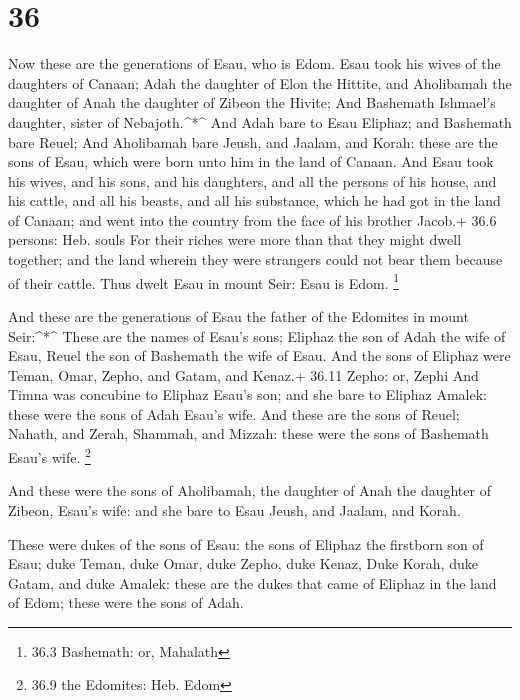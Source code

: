 \hypertarget{section-35}{%
\section{36}\label{section-35}}

 Now these are the generations of Esau, who is Edom.
 Esau took his wives of the daughters of Canaan; Adah the
daughter of Elon the Hittite, and Aholibamah the daughter of Anah the
daughter of Zibeon the Hivite;  And Bashemath Ishmael's
daughter, sister of Nebajoth.\^{}*\^{}  And Adah bare to
Esau Eliphaz; and Bashemath bare Reuel;  And Aholibamah bare
Jeush, and Jaalam, and Korah: these are the sons of Esau, which were
born unto him in the land of Canaan.  And Esau took his
wives, and his sons, and his daughters, and all the persons of his
house, and his cattle, and all his beasts, and all his substance, which
he had got in the land of Canaan; and went into the country from the
face of his brother Jacob.+ 36.6 persons: Heb. souls  For
their riches were more than that they might dwell together; and the land
wherein they were strangers could not bear them because of their cattle.
 Thus dwelt Esau in mount Seir: Esau is Edom. \footnote{36.3
  Bashemath: or, Mahalath}

 And these are the generations of Esau the father of the
Edomites in mount Seir:\^{}*\^{}  These are the names of
Esau's sons; Eliphaz the son of Adah the wife of Esau, Reuel the son of
Bashemath the wife of Esau.  And the sons of Eliphaz were
Teman, Omar, Zepho, and Gatam, and Kenaz.+ 36.11 Zepho: or, Zephi
 And Timna was concubine to Eliphaz Esau's son; and she
bare to Eliphaz Amalek: these were the sons of Adah Esau's wife.
 And these are the sons of Reuel; Nahath, and Zerah,
Shammah, and Mizzah: these were the sons of Bashemath Esau's wife.
\footnote{36.9 the Edomites: Heb. Edom}

 And these were the sons of Aholibamah, the daughter of
Anah the daughter of Zibeon, Esau's wife: and she bare to Esau Jeush,
and Jaalam, and Korah.

 These were dukes of the sons of Esau: the sons of Eliphaz
the firstborn son of Esau; duke Teman, duke Omar, duke Zepho, duke
Kenaz,  Duke Korah, duke Gatam, and duke Amalek: these are
the dukes that came of Eliphaz in the land of Edom; these were the sons
of Adah.

